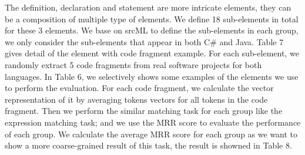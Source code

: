 The definition, declaration and statement are more intricate elements, they can be a composition of multiple type of elements. We define 18 sub-elements in total for these 3 elements. We base on srcML \cite{collard2011lightweight} to define the sub-elements in each group, we only consider the sub-elements that appear in both C\# and Java. Table 7 gives detail of the element with code fragment example. For each sub-element, we randomly extract 5 code fragments from real software projects for both languages. In Table 6, we selectively shows some examples of the elements we use to perform the evaluation. For each code fragment, we calculate the vector representation of it by averaging tokens vectors for all tokens in the code fragment. Then we perform the similar matching task for each group like the expression matching task; and we use the MRR score to evaluate the performance of each group.  We calculate the average MRR score for each group as we want to show a more coarse-grained result of this task, the result is showned in Table 8.


